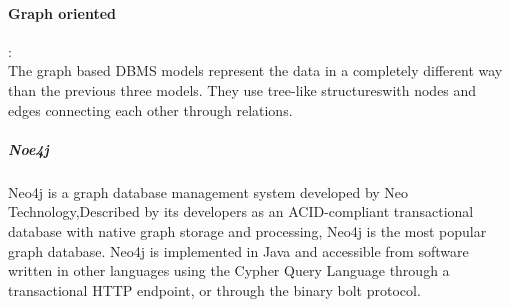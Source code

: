 \paragraph{Graph oriented} :\\
\label{sec:sec01}
The graph based DBMS models represent the data in a completely different way than the previous three models.
 They use tree-like structureswith nodes and edges connecting each other through relations.
\subparagraph{Noe4j} 
\label{sec:sec01}
Neo4j is a graph database management system developed by Neo Technology,Described by its 
developers as an ACID-compliant transactional database with native graph storage and processing,
Neo4j is the most popular graph database.
Neo4j is implemented in Java and accessible 
from software written in other languages using the Cypher 
Query Language through a transactional HTTP endpoint, or through the binary bolt protocol.


